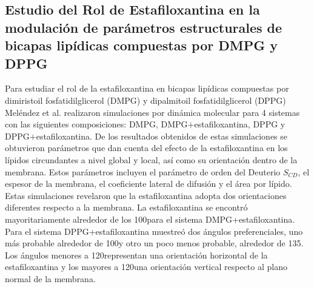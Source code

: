 \subsection*{Estudio del Rol de Estafiloxantina en la modulaci\'{o}n de par\'{a}metros estructurales de bicapas lip\'{i}dicas compuestas por DMPG y DPPG  \cite{Melendez-Delgado2018StudyingBilayers}}
Para estudiar el rol de la estafiloxantina en bicapas lip\'{i}dicas compuestas por dimiristoil fosfatidilglicerol (DMPG) y dipalmitoil fosfatidilglicerol (DPPG) Mel\'{e}ndez et al. \cite{Melendez-Delgado2018StudyingBilayers} realizaron simulaciones por din\'{a}mica molecular para 4 sistemas con las siguientes composiciones: DMPG, DMPG$+$estafiloxantina, DPPG y DPPG$+$estafiloxantina. De los resultados obtenidos de estas simulaciones se obtuvieron par\'{a}metros que dan cuenta del efecto de la estafiloxantina en los l\'{i}pidos circundantes a nivel global y local, as\'{i} como su orientaci\'{o}n dentro de la membrana. Estos par\'{a}metros incluyen el par\'{a}metro de orden del Deuterio $S_{CD}$, el espesor de la membrana, el coeficiente lateral de difusi\'{o}n y el \'{a}rea por l\'{i}pido. \\

Estas simulaciones revelaron que la estafiloxantina adopta dos orientaciones diferentes respecto a la membrana. La estafiloxantina se encontr\'{o} mayoritariamente alrededor de los 100\textdegree para el sistema   DMPG+estafiloxantina. Para el sistema  DPPG+estafiloxantina muestre\'{o} dos \'{a}ngulos preferenciales,  uno m\'{a}s probable alrededor de 100\textdegree y otro un poco menos probable, alrededor de 135\textdegree. Los \'{a}ngulos menores a 120\textdegree representan una orientaci\'{o}n horizontal de la estafiloxantina y los mayores a 120\textdegree  una orientaci\'{o}n vertical respecto al plano normal de la membrana.\\

